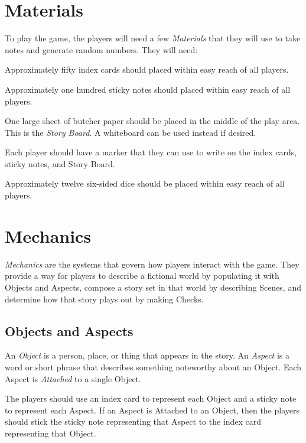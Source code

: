 \documentclass[12pt, a5paper, parskip=half-]{scrartcl}
\begin{document}
\section*{Materials}
To play the game, the players will need a few \emph{Materials} that they will use to take notes and generate random numbers. They will need:
\begin{description}[leftmargin=0pt]
	\item[Index Cards] Approximately fifty index cards should placed within easy reach of all players. 
	\item[Sticky Notes] Approximately one hundred sticky notes should placed within easy reach of all players.
	\item[Butcher Paper]	 One large sheet of butcher paper should be placed in the middle of the play area.  This is the \emph{Story Board}. A whiteboard can be used instead if desired.
	\item[Markers] Each player should have a marker that they can use to write on the index cards, sticky notes, and Story Board.
	\item[Dice] Approximately twelve six-sided dice should be placed within easy reach of all players. 
\end{description}

\newpage

\section*{Mechanics}    
\emph{Mechanics} are the systems that govern how players interact with the game.
They provide a way for players to describe a fictional world by populating it with Objects and Aspects, compose a story set in that world by describing Scenes, and determine how that story plays out by making Checks.

\subsection*{Objects and Aspects}
An \emph{Object} is a person, place, or thing that appears in the story.
An \emph{Aspect} is a word or short phrase that describes something noteworthy about an Object.
Each Aspect is \emph{Attached} to a single Object.

The players should use an index card to represent each Object and a sticky note to represent each Aspect.  If an Aspect is Attached to an Object, then the players should stick the sticky note representing that Aspect to the index card representing that Object.
\end{document}
